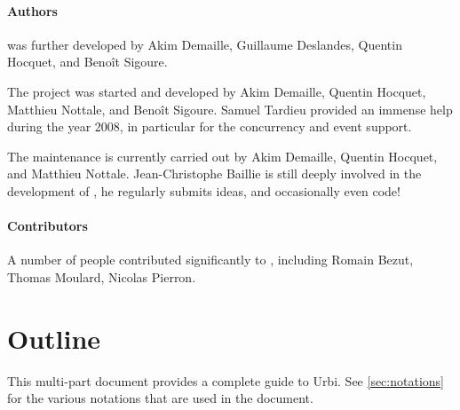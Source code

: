 \paragraph{Authors}
 was further developed by Akim Demaille, Guillaume Deslandes, Quentin
Hocquet, and Benoît Sigoure.

The  project was started and developed by Akim Demaille, Quentin
Hocquet, Matthieu Nottale, and Benoît Sigoure.  Samuel Tardieu provided an
immense help during the year 2008, in particular for the concurrency and
event support.

The maintenance is currently carried out by Akim Demaille, Quentin
Hocquet, and Matthieu Nottale.  Jean-Christophe Baillie is still
deeply involved in the development of \us, he regularly submits ideas,
and occasionally even code!

\paragraph{Contributors}

A number of people contributed significantly to \urbi, including Romain
Bezut, Thomas Moulard, Nicolas Pierron.

\section{Outline}

This multi-part document provides a complete guide to Urbi.  See
\autoref{sec:notations} for the various notations that are used in the
document.

\newenvironment{partDescription}[2]
{%
  \item[\autoref{#1} --- \nameref{#1}]~\\%
  #2
  \begin{description}%
    \let\itemOrig\item%
    \renewcommand{\item}[1][]{\itemOrig[~~\autoref{##1} --- \nameref{##1}]~\\}%
  }{%
  \end{description}%
}

\begin{description}




{
  
}

\end{description}


